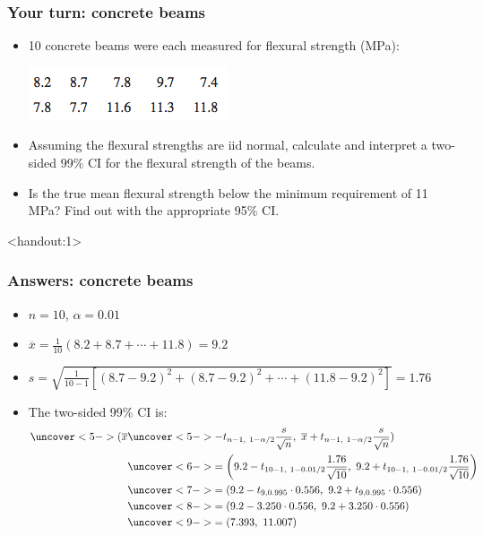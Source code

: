 \documentclass[handout]{beamer}\usepackage[]{graphicx}\usepackage[]{color}
\newcommand{\answers}{1}
\providecommand{\ov}[1]{\overline{#1}}
\numberwithin{equation}{section}
\begin{document}
\begin{frame}
\frametitle{Your turn: concrete beams}
\begin{itemize}
\item 10 concrete beams were each measured for flexural strength (MPa):
\begin{center}
 \includegraphics{../../fig/fbeams.png}
\end{center}
\pause \item Assuming the flexural strengths are iid normal, calculate and interpret a two-sided 99\% CI for the flexural strength of the beams.
\pause \item Is the true mean flexural strength below the minimum requirement of 11 MPa? Find out with the appropriate 95\% CI.
\end{itemize}
\end{frame}

\begin{frame}<handout:\answers>
\frametitle{Answers: concrete beams} \scriptsize
\begin{itemize}
\item $n = 10$, $\alpha = 0.01$
\pause \item $\ov{x} = \frac{1}{10}(8.2 + 8.7 + \cdots + 11.8) = 9.2$
\pause \item $s = \sqrt{\frac{1}{10-1} [(8.7 - 9.2)^2 + (8.7 - 9.2)^2 + \cdots + (11.8-9.2)^2]} = 1.76$
\pause \item The two-sided 99\% CI is:
\begin{align*}
\uncover<5->{(\ov{x}}& \uncover<5->{ - t_{n - 1, \ 1 - \alpha/2} \frac{s}{\sqrt{n}},\ \ov{x} + t_{n - 1, \ 1- \alpha/2 } \frac{s}{\sqrt{n}})} \\
&\uncover<6->{= \left (9.2 - t_{10 - 1, \ 1 - 0.01/2} \frac{1.76}{\sqrt{10}}, \ 9.2 + t_{10 - 1, \ 1 - 0.01/2} \frac{1.76}{\sqrt{10}} \right )} \\
&\uncover<7->{= (9.2 - t_{9, 0.995} \cdot 0.556, \ 9.2 + t_{9, 0.995} \cdot 0.556)} \\
&\uncover<8->{= (9.2 - 3.250 \cdot 0.556, \ 9.2 + 3.250 \cdot 0.556)} \\
&\uncover<9->{= (7.393, \ 11.007)}
\end{align*}
\end{itemize}
\end{frame}
\end{document}
